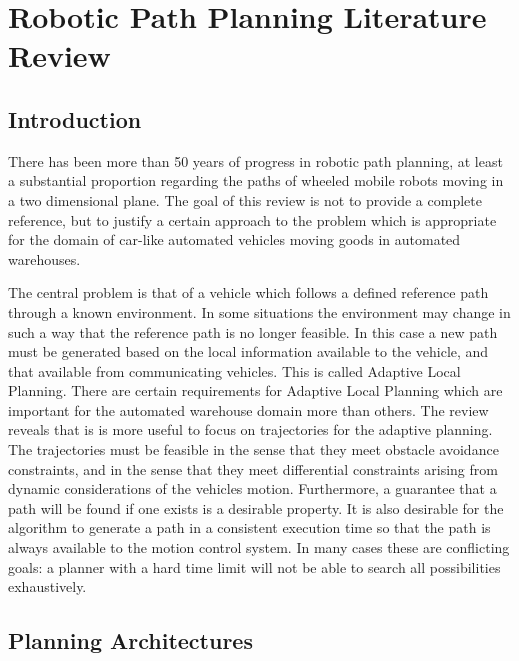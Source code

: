 \chapter{Robotic Path Planning Literature Review}

\ifpdf
    \graphicspath{{Chapter1/Chapter1Figs/PNG/}{Chapter1/Chapter1/PDF/}{Chapter1/Chapter1Figs/}}
\else
    \graphicspath{{Chapter1/Chapter1Figs/EPS/}{Chapter1/Chapter1/}}
\fi

\section{Introduction}
There has been more than 50 years of progress in robotic path planning, at least a substantial proportion regarding the paths of wheeled mobile robots moving in a two dimensional plane. The goal of this review is not to provide a complete reference, but to justify a certain approach to the problem which is appropriate for the domain of car-like automated vehicles moving goods in automated warehouses.

The central problem is that of a vehicle which follows a defined reference path through a known environment. In some situations the environment may change in such a way that the reference path is no longer feasible. In this case a new path must be generated based on the local information available to the vehicle, and that available from communicating vehicles. This is called Adaptive Local Planning. There are certain requirements for Adaptive Local Planning which are important for the automated warehouse domain more than others. The review reveals that is is more useful to focus on trajectories for the adaptive planning. The trajectories must be feasible in the sense that they meet obstacle avoidance constraints, and in the sense that they meet differential constraints arising from dynamic considerations of the vehicles motion. Furthermore, a guarantee that a path will be found if one exists is a desirable property. It is also desirable for the algorithm to generate a path in a consistent execution time so that the path is always available to the motion control system. In many cases these are conflicting goals: a planner with a hard time limit will not be able to search all possibilities exhaustively. 

\section{Planning Architectures}

